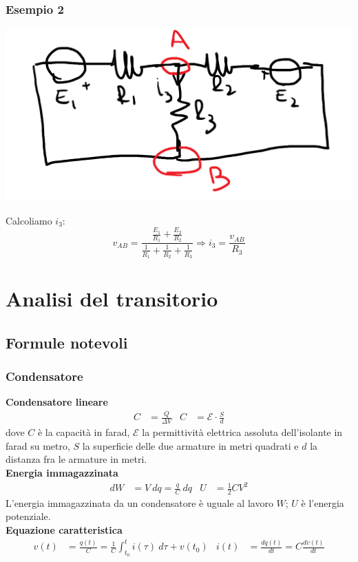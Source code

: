 \documentclass{article}
\begin{document}
\subsubsection{Esempio 2}
\begin{center}
    \includegraphics[scale=0.3]{Image/Es_Millman_2.png}
\end{center}
Calcoliamo $i_3$:
\[
    v_{AB} = \frac{\frac{E_1}{R_1}+\frac{E_2}{R_2}}{\frac{1}{R_1}+\frac{1}{R_2}+\frac{1}{R_3}} \Rightarrow i_3 = \frac{v_{AB}}{R_3}
\]




\section{Analisi del transitorio}

\subsection{Formule notevoli}
\subsubsection{Condensatore}
\textbf{Condensatore lineare}
\begin{align*}
    C&=\frac{Q}{\Delta V} & C &= \mathcal{E} \cdot \frac{S}{d}
\end{align*}
dove $C$ è la capacità in farad,  $\mathcal{E}$ la permittività elettrica assoluta dell'isolante in farad su metro, $S$ la superficie delle due armature in metri quadrati e $d$ la distanza fra le armature in metri. 
\vspace*{0.2cm}\\
\textbf{Energia immagazzinata}
\begin{align*}
    dW &= V \ dq = \frac{q}{C} \ dq & U &= \frac{1}{2} CV^2 
\end{align*}
L'energia immagazzinata da un condensatore è uguale al lavoro $W$; $U$ è l'energia potenziale.
\vspace*{0.2cm}\\
\textbf{Equazione caratteristica}
\begin{align*}
    v(t) &= \frac{q(t)}{C} = \frac{1}{C} \int_{t_0}^t i(\tau) \ d\tau + v(t_0) & i(t) &= \frac{dq(t)}{dt} = C \frac{dv(t)}{dt}
\end{align*}
\end{document}
